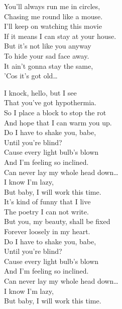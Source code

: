 You'll always run me in circles, \\
Chasing me round like a mouse. \\
I'll keep on watching this movie \\
If it means I can stay at your house. \\

But it's not like you anyway \\
To hide your sad face away. \\
It ain't gonna stay the same, \\
'Cos it's got old… \\





I knock, hello, but I see \\
That you've got hypothermia. \\
So I place a block to stop the rot \\
And hope that I can warm you up. \\

Do I have to shake you, babe, \\
Until you're blind? \\
Cause every light bulb's blown \\
And I'm feeling so inclined. \\

Can never lay my whole head down… \\
I know I'm lazy, \\
But baby, I will work this time. \\

It's kind of funny that I live \\
The poetry I can not write. \\
But you, my beauty, shall be fixed \\
Forever loosely in my heart. \\

Do I have to shake you, babe, \\
Until you're blind? \\
Cause every light bulb's blown \\
And I'm feeling so inclined. \\

Can never lay my whole head down… \\
I know I'm lazy, \\
But baby, I will work this time. \\

